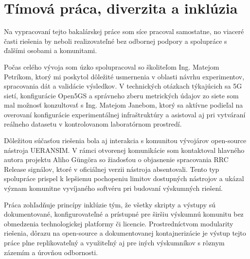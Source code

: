 \section{Tímová práca, diverzita a inklúzia}
Na vypracovaní tejto bakalárskej práce som síce pracoval samostatne, no viaceré časti riešenia by neboli realizovateľné bez odbornej podpory a spolupráce s ďalšími osobami a komunitami.

Počas celého vývoja som úzko spolupracoval so školiteľom Ing. Matejom Petríkom, ktorý mi poskytol dôležité usmernenia v oblasti návrhu experimentov, spracovania dát a validácie výsledkov. V technických otázkach týkajúcich sa 5G sietí, konfigurácie Open5GS a správneho zberu metrických údajov zo siete som mal možnosť konzultovať s Ing. Matejom Janebom, ktorý sa aktívne podieľal na overovaní konfigurácie experimentálnej infraštruktúry a asistoval aj pri vytváraní reálneho datasetu v kontrolovanom laboratórnom prostredí.

Dôležitou súčasťou riešenia bola aj interakcia s komunitou vývojárov open-source nástroja UERANSIM. V rámci otvorenej komunikácie som kontaktoval hlavného autora projektu Aliho Güngöra so žiadosťou o objasnenie spracovania RRC Release signálov, ktoré v oficiálnej verzii nástroja absentovali. Tento typ spolupráce prispel k lepšiemu pochopeniu limitov dostupných nástrojov a ukázal význam komunitne vyvíjaného softvéru pri budovaní výskumných riešení.

Práca zohľadňuje princípy inklúzie tým, že všetky skripty a výstupy sú dokumentované, konfigurovateľné a prístupné pre širšiu výskumnú komunitu bez obmedzenia technologickej platformy či licencie. Prostredníctvom modularity riešenia, dôrazu na open-source a dokumentovanej kontajnerizácie je výstup tejto práce plne replikovateľný a využiteľný aj pre iných výskumníkov s rôznym zázemím a úrovňou odbornosti.
